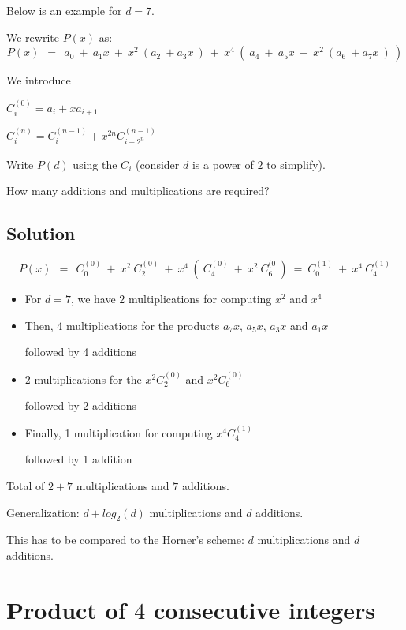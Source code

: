 \documentclass{article}[12pt]
\begin{document}
Below is an example for $d=7$.

We rewrite $P(x)$ as:
\[
P(x) \ \ = \ \ a_0 \ + \ a_1 x \ + \ x^2 \ ( a_2  \ + a_3 x \ ) \ + 
\ x^4 \ ( \ a_4 \ + \ a_5 x \ + \ x^2 \ ( a_6  \ + a_7 x \ ) \ )
\]

%

We introduce 

$C_i^{(0)} = a_i + x a_{i+1}$ 

$C_i^{(n)} = C_i^{(n-1)} + x^{2n} C_{i+2^n}^{(n-1)}$ 
\bigskip

Write $P(d)$ using the $C_i$ (consider $d$ is a power of $2$ to simplify).

How many additions and multiplications are required?

\bigskip

\subsection{Solution}
\[
P(x) \ \ = \ \ C_{0}^{(0)} \ + \ x^2 \ C_2^{(0)} \ + 
\ x^4 \ ( \ C_4^{(0)} \ + \ x^2 \ C_6^{(0} \ )
\ = \ C_0^{(1)} \ + \ x^4 \ C_4^{(1)} 
\]

\begin{itemize}
\item
For $d=7$, we have $2$ multiplications for computing $x^2$ and $x^4$
\item
Then, 4 multiplications for the products $a_7 x$,  $a_5 x$, $a_3 x$ and $a_1 x$

followed by 4 additions
\item
2 multiplications for the $x^2 C_2^{(0)}$ and  $x^2 C_6^{(0)}$

followed by 2 additions
\item
Finally, 1 multiplication for computing $x^4 C_4^{(1)}$

followed by 1 addition
\end{itemize}

Total of $2 + 7$ multiplications and $7$ additions.

Generalization: 
$d + log_2(d)$ multiplications and $d$ additions.
\bigskip

This has to be compared to the Horner's scheme: $d$ multiplications and $d$ additions.


\section{Product of $4$ consecutive integers}
\end{document}
